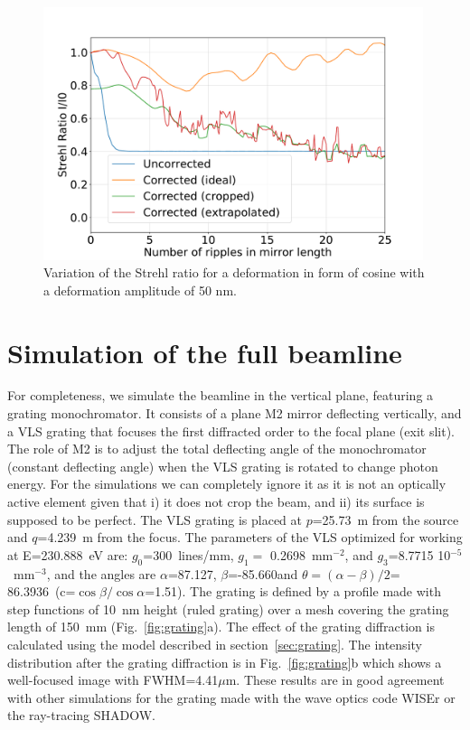 \documentclass{iucr}
\begin{document}
  \begin{figure}
  \label{fig:strehlRatioCosine} 
  \includegraphics[width=0.99\textwidth]{figures/scan_peak_vs_cos50.pdf}
  \caption{Variation of the Strehl ratio for a deformation in form of cosine with a deformation amplitude of 50 nm.}
  \end{figure} 

%
%
%
\section{Simulation of the full beamline}
\label{sec:2D}

For completeness, we simulate the beamline in the vertical plane, featuring a grating monochromator. It consists of a plane M2 mirror deflecting vertically, and a VLS grating that focuses the first diffracted order to the focal plane (exit slit). The role of M2 is to adjust the total deflecting angle of the monochromator (constant deflecting angle) when the VLS grating is rotated to change photon energy. For the simulations we can completely ignore it as it is not an optically active element given that i) it does not crop the beam, and ii) its surface is supposed to be perfect. The VLS grating is placed at $p$=25.73~m from the source and $q$=4.239~m from the focus. The parameters of the VLS optimized for working at E=230.888~eV are: $g_0$=300~lines/mm, $g_1=$ 0.2698~mm$^{-2}$, and $g_3$=8.7715 10${^{-5}}$~mm$^{-3}$, and the angles are $\alpha$=87.127\textdegree, $\beta$=-85.660\textdegree and $\theta=(\alpha-\beta)/2$= 86.3936\textdegree ~(c=$\cos \beta / \cos \alpha$=1.51). The grating is defined by a profile made with step functions of 10~nm height (ruled grating) over a mesh covering the grating length of 150~mm (Fig.~\ref{fig:grating}a). The effect of the grating diffraction is calculated using the model described in section~\ref{sec:grating}. The intensity distribution after the grating diffraction is in Fig.~\ref{fig:grating}b which shows a well-focused image with FWHM=4.41$\mu$m. These results are in good agreement with other simulations for the grating made with the wave optics code WISEr \cite{Raimondi2014} or the ray-tracing SHADOW.
\end{document}
